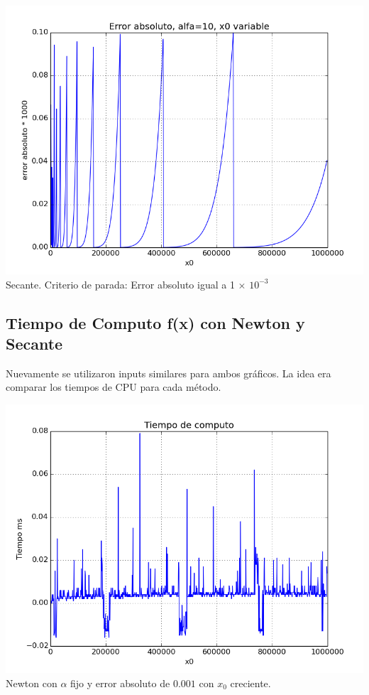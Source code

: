 \begin{center}
\includegraphics[scale=0.5]{graficos/x0s-f-secante-alfa_fijo-absoluto-0.001-alejando.png}\\
Secante. Criterio de parada: Error absoluto igual a 1 $\times$ $10^{-3}$
\end{center}


\subsection{Tiempo de Computo f(x) con Newton y Secante}
Nuevamente se utilizaron inputs similares para ambos gráficos. La idea era comparar los tiempos de CPU para cada método.
\begin{center}
\includegraphics[scale=0.5]{graficos/tiempo-f-newton-alfa_fijo-absoluto-0.001-alejando.png}\\
Newton con $\alpha$ fijo y error absoluto de $0.001$ con $x_0$ creciente.
\end{center}

